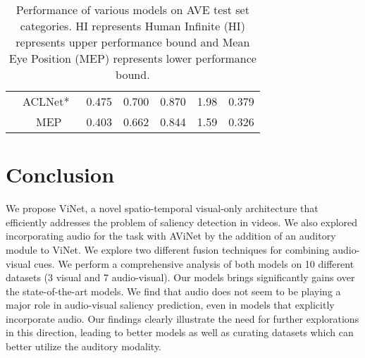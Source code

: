 \documentclass[letterpaper, 10 pt, conference]{ieeeconf}  \usepackage{times}
\begin{document}
\begin{table}[]
\begin{center}
\begin{tabular}{|c|c|ccccc|}
 & ACLNet*~\cite{wang2019revisiting} & 0.475 &  0.700 & 0.870 & 1.98 & 0.379  \\
 & MEP & 0.403 & 0.662 & 0.844 & 1.59 & 0.326 \\ \hline
\end{tabular}
\end{center}
\caption{Performance of various models on AVE test set categories. HI represents Human Infinite (HI) represents upper performance bound and Mean Eye Position (MEP) represents lower performance bound.}
\label{table:dave_results}
\vspace{-1.5em}
\end{table}











\section{Conclusion}
We propose ViNet, a novel spatio-temporal visual-only architecture that efficiently addresses the problem of saliency detection in videos. We also explored incorporating audio for the task with AViNet by the addition of an auditory module to ViNet. We explore two different fusion techniques for combining audio-visual cues. We perform a comprehensive analysis of both models on 10 different datasets (3 visual and 7 audio-visual). Our models brings significantly gains over the state-of-the-art models. We find that audio does not seem to be playing a major role in audio-visual saliency prediction, even in models that explicitly incorporate audio. Our findings clearly illustrate the need for further explorations in this direction, leading to better models as well as curating datasets which can better utilize the auditory modality. 





\end{document}
